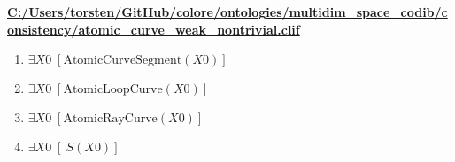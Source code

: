 \documentclass{article}
\begin{document}
\textbf{\url{C:/Users/torsten/GitHub/colore/ontologies/multidim\_space\_codib/consistency/atomic\_curve\_weak\_nontrivial.clif}}

\begin{enumerate}
\item $\exists X0\;  \left[ \textrm{AtomicCurveSegment}(X0) \right]$
\item $\exists X0\;  \left[ \textrm{AtomicLoopCurve}(X0) \right]$
\item $\exists X0\;  \left[ \textrm{AtomicRayCurve}(X0) \right]$
\item $\exists X0\;  \left[ ~S(X0) \right]$
\end{enumerate}
\end{document}
